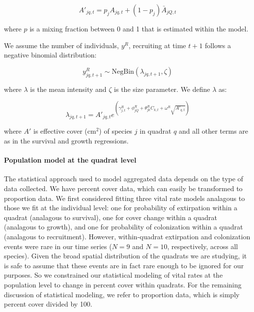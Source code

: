 \documentclass[12pt,]{article}
\begin{document}
\begin{equation}
A'_{jq,t} = p_{j}A_{jq,t} + (1-p_{j})\bar{A}_{jQ,t}
\end{equation}

where \(p\) is a mixing fraction between 0 and 1 that is estimated
within the model.

We assume the number of individuals, \(y^{R}\), recruiting at time
\(t+1\) follows a negative binomial distribution:

\begin{equation}
y^{R}_{jq,t+1} \sim \text{NegBin}(\lambda_{jq,t+1},\zeta)
\end{equation}

where \(\lambda\) is the mean intensity and \(\zeta\) is the size
parameter. We define \(\lambda\) as:

\begin{equation}
\lambda_{jq,t+1} = A'_{jq,t}e^{(\gamma^{R}_{j,t} + \phi^{R}_{jQ} + \theta^{R}_{jk}C_{k,t} + \omega^{R}\sqrt{A'_{q,t}})}
\end{equation}

where \(A'\) is effective cover (\(\text{cm}^2\)) of species \(j\) in
quadrat \(q\) and all other terms are as in the survival and growth
regressions.

\paragraph{Population model at the quadrat
level}\label{population-model-at-the-quadrat-level}

The statistical approach used to model aggregated data depends on the
type of data collected. We have percent cover data, which can easily be
transformed to proportion data. We first considered fitting three vital
rate models analagous to those we fit at the individual level: one for
probability of extirpation within a quadrat (analagous to survival), one
for cover change within a quadrat (analagous to growth), and one for
probability of colonization within a quadrat (analagous to recruitment).
However, within-quadrat extirpation and colonization events were rare in
our time series (\(N=9\) and \(N=10\), respectively, across all
species). Given the broad spatial distribution of the quadrats we are
studying, it is safe to assume that these events are in fact rare enough
to be ignored for our purposes. So we constrained our statistical
modeling of vital rates at the population level to change in percent
cover within quadrats. For the remaining discussion of statistical
modeling, we refer to proportion data, which is simply percent cover
divided by 100.
\end{document}
